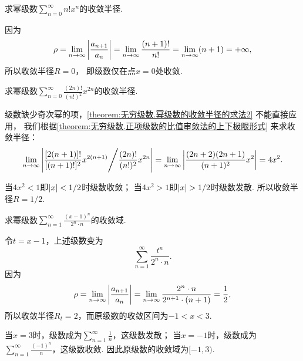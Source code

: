 \begin{example}
求幂级数\(\sum_{n=0}^\infty n! x^n\)的收敛半径.
\begin{solution}
因为\[
	\rho
	= \lim_{n\to\infty} \abs{\frac{a_{n+1}}{a_n}}
	= \lim_{n\to\infty} \frac{(n+1)!}{n!}
	= \lim_{n\to\infty} (n+1)
	= +\infty,
\]
所以收敛半径\(R = 0\)，
即级数仅在点\(x = 0\)处收敛.
\end{solution}
\end{example}

\begin{example}
求幂级数\(\sum_{n=0}^\infty \frac{(2n)!}{(n!)^2} x^{2n}\)的收敛半径.
\begin{solution}
级数缺少奇次幂的项，\cref{theorem:无穷级数.幂级数的收敛半径的求法2} 不能直接应用，
我们根据\cref{theorem:无穷级数.正项级数的比值审敛法的上下极限形式} 来求收敛半径：
\[
	\lim_{n\to\infty} \abs{
		{\frac{[2(n+1)]!}{[(n+1)!]^2} x^{2(n+1)}}
		\Bigg/
		{\frac{(2n)!}{(n!)^2} x^{2n}}
	}
	= \lim_{n\to\infty} \abs{\frac{(2n+2)(2n+1)}{(n+1)^2} x^2}
	= 4 x^2.
\]

当\(4 x^2 < 1\)即\(\abs{x} < 1/2\)时级数收敛；
当\(4 x^2 > 1\)即\(\abs{x} > 1/2\)时级数发散.
所以收敛半径\(R = 1/2\).
\end{solution}
\end{example}

\begin{example}
求幂级数\(\sum_{n=1}^\infty \frac{(x-1)^n}{2^n \cdot n}\)的收敛域.
\begin{solution}
令\(t = x-1\)，上述级数变为\[
	\sum_{n=1}^\infty \frac{t^n}{2^n \cdot n}.
\]
因为\[
	\rho
	= \lim_{n\to\infty} \abs{\frac{a_{n+1}}{a_n}}
	= \lim_{n\to\infty} \frac{2^n \cdot n}{2^{n+1} \cdot (n+1)}
	= \frac{1}{2},
\]
所以收敛半径\(R_t = 2\)，而原级数的收敛区间为\(-1<x<3\).

当\(x=3\)时，级数成为\(\sum_{n=1}^\infty \frac{1}{n}\)，这级数发散；
当\(x=-1\)时，级数成为\(\sum_{n=1}^\infty \frac{(-1)^n}{n}\)，这级数收敛.
因此原级数的收敛域为\([-1,3)\).
\end{solution}
\end{example}

